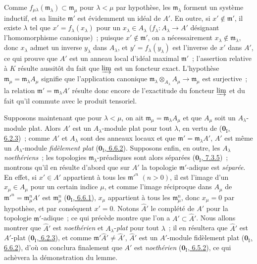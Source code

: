 Comme $f_{\mu\lambda}(\mathfrak m_\lambda)\subset\mathfrak m_\mu$ pour
$\lambda<\mu$ par hypothèse, les $\mathfrak m_\lambda$ forment un système
inductif, et sa limite $\mathfrak m'$ est évidemment un idéal de $A'$. En
outre, si $x'\notin\mathfrak m'$, il existe $\lambda$ tel que
$x'=f_\lambda(x_\lambda)$ pour un $x_\lambda\in A_\lambda$
($f_\lambda:A_\lambda\to A'$ désignant l'homomorphisme canonique)~; puisque
$x'\notin\mathfrak m'$, on a nécessairement
$x_\lambda\notin\mathfrak m_\lambda$, donc $x_\lambda$ admet un inverse
$y_\lambda$ dans $A_\lambda$, et $y'=f_\lambda(y_\lambda)$ est l'inverse de
$x'$ dans $A'$, ce qui prouve que $A'$ est un anneau local d'idéal maximal
$\mathfrak m'$~; l'assertion relative à $K$ résulte aussitôt du fait que
$\varinjlim$ est un foncteur exact. L'hypothèse
$\mathfrak m_\mu=\mathfrak m_\lambda A_\mu$ signifie que l'application
canonique
$\mathfrak m_\lambda\otimes_{A_\lambda}A_\mu\to\mathfrak m_\mu$ est
surjective~; la relation $\mathfrak m'=\mathfrak m_\lambda A'$ résulte donc
encore de l'exactitude du foncteur $\varinjlim$ et du fait qu'il commute avec
le produit tensoriel.

Supposons maintenant que pour $\lambda<\mu$, on ait
$\mathfrak m_\mu=\mathfrak m_\lambda A_\mu$ et que $A_\mu$ soit un
$A_\lambda$-module plat. Alors $A'$ est un $A_\lambda$-module plat pour tout
$\lambda$, en vertu de (\hyperref[0.6.2.3-fr]{$\mathbf{0}_{\mathrm I}$, 6.2.3})~;
comme $A'$ et $A_\lambda$ sont des anneaux locaux et que
$\mathfrak m'=\mathfrak m_\lambda A'$, $A'$ est même un
$A_\lambda$-module \emph{fidèlement plat}
(\hyperref[0.6.6.2-fr]{$\mathbf{0}_{\mathrm I}$, 6.6.2}). Supposons enfin, en outre,
les $A_\lambda$ \emph{noethériens}~; les topologies
$\mathfrak m_\lambda$-préadiques sont alors séparées
(\hyperref[0.7.3.5-fr]{$\mathbf{0}_{\mathrm I}$, 7.3.5})~; montrons qu'il en résulte
d'abord que sur $A'$ la topologie $\mathfrak m'$-adique est \emph{séparée}.
En effet, si $x'\in A'$ appartient à tous les $\mathfrak m'^{n}$ $(n>0)$,
il est l'image d'un $x_\mu\in A_\mu$ pour un certain indice $\mu$, et comme
l'image réciproque dans $A_\mu$ de
$\mathfrak m'^{n}=\mathfrak m_\mu^n A'$ est $\mathfrak m_\mu^n$
(\hyperref[0.6.6.1-fr]{$\mathbf{0}_{\mathrm I}$, 6.6.1}), $x_\mu$ appartient à tous
les $\mathfrak m_\mu^n$, donc $x_\mu=0$ par hypothèse, et par conséquent
$x'=0$. Notons $\widehat A'$ le complété de $A'$ pour la topologie
$\mathfrak m'$-adique~; ce qui précède montre que l'on a
$A'\subset\widehat A'$. Nous allons montrer que $\widehat A'$ est
\emph{noethérien} et $A_\lambda$-\emph{plat} pour tout $\lambda$~; il en
résultera que $\widehat A'$ est $A'$-plat
(\hyperref[0.6.2.3-fr]{$\mathbf{0}_{\mathrm I}$, 6.2.3}), et comme
$\mathfrak m'\widehat A'\ne\widehat A'$, $\widehat A'$ est un $A'$-module
fidèlement plat (\hyperref[0.6.6.2-fr]{$\mathbf{0}_{\mathrm I}$, 6.6.2}), d'où on
conclura finalement que $A'$ est \emph{noethérien}
(\hyperref[0.6.5.2-fr]{$\mathbf{0}_{\mathrm I}$, 6.5.2}), ce qui achèvera la
démonstration du lemme.

